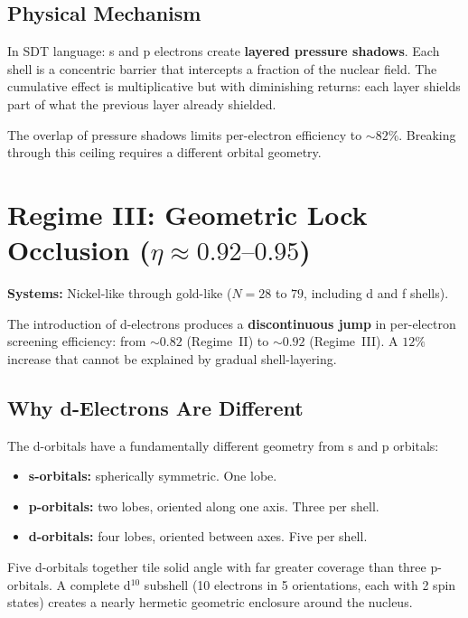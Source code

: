 \subsection{Physical Mechanism}

In SDT language: s and p electrons create \textbf{layered pressure shadows}.  Each shell is a concentric barrier that intercepts a fraction of the nuclear field.  The cumulative effect is multiplicative but with diminishing returns: each layer shields part of what the previous layer already shielded.

The overlap of pressure shadows limits per-electron efficiency to $\sim 82\%$.  Breaking through this ceiling requires a different orbital geometry.


\section{Regime III: Geometric Lock Occlusion ($\eta \approx 0.92\text{--}0.95$)}
\label{sec:regime3}

\textbf{Systems:} Nickel-like through gold-like ($N = 28$ to $79$, including d and f shells).

The introduction of d-electrons produces a \textbf{discontinuous jump} in per-electron screening efficiency: from $\sim 0.82$ (Regime~II) to $\sim 0.92$ (Regime~III).  A $12\%$ increase that cannot be explained by gradual shell-layering.

\subsection{Why d-Electrons Are Different}

The d-orbitals have a fundamentally different geometry from s and p orbitals:
\begin{itemize}
  \item \textbf{s-orbitals:} spherically symmetric.  One lobe.
  \item \textbf{p-orbitals:} two lobes, oriented along one axis.  Three per shell.
  \item \textbf{d-orbitals:} four lobes, oriented between axes.  Five per shell.
\end{itemize}

Five d-orbitals together tile solid angle with far greater coverage than three p-orbitals.  A complete d$^{10}$ subshell (10 electrons in 5 orientations, each with 2 spin states) creates a nearly hermetic geometric enclosure around the nucleus.

